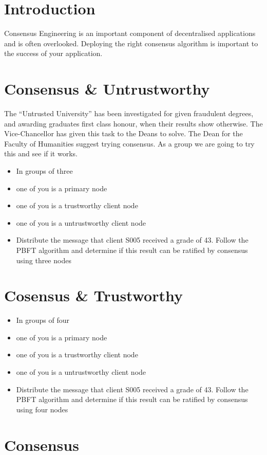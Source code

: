 \section{Introduction}
Consensus Engineering is an important component of decentralised applications and is often overlooked. Deploying the right consensus algorithm is important to the success of your application.

\section{Consensus \& Untrustworthy}
The ``Untrusted University'' has been investigated for given fraudulent degrees, and awarding graduates first class honour, when their results show otherwise. The Vice-Chancellor has given this task to the Deans to solve. The Dean for the Faculty of Humanities suggest trying consensus. As a group we are going to try this and see if it works.


\begin{itemize}
	\item In groups of three
	\item one of you is a primary node
	\item one of you is a trustworthy client node
	\item one of you is a untrustworthy client node
	\item Distribute the message that client S005 received a grade of 43. Follow the PBFT algorithm and determine if this result can be ratified by consensus using three nodes
\end{itemize}


\section{Cosensus \& Trustworthy}
\begin{itemize}
	\item In groups of four 
	\item one of you is a primary node
	\item one of you is a trustworthy client node
	\item one of you is a untrustworthy client node
	\item Distribute the message that client S005 received a grade of 43. Follow the PBFT algorithm and determine if this result can be ratified by consensus using four nodes
\end{itemize}

\section{Consensus}


